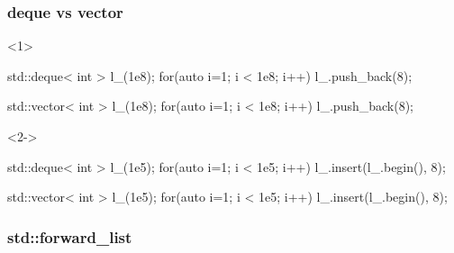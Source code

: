 \documentclass[aspectratio=43]{beamer}
\begin{document}
\begin{frame}[fragile]\frametitle{deque vs vector}
\begin{onlyenv}<1>
  \begin{Cpplisting}{}
std::deque< int > l_(1e8);
for(auto i=1; i < 1e8; i++){
  l_.push_back(8);
}
  \end{Cpplisting}
  \begin{Cpplisting}{}
std::vector< int > l_(1e8);
for(auto i=1; i < 1e8; i++){
  l_.push_back(8);
}
  \end{Cpplisting}
\end{onlyenv}

\begin{onlyenv}<2->
  \begin{Cpplisting}{}
std::deque< int > l_(1e5);
for(auto i=1; i < 1e5; i++){
  l_.insert(l_.begin(), 8);
}
  \end{Cpplisting}
  \begin{Cpplisting}{}
std::vector< int > l_(1e5);
for(auto i=1; i < 1e5; i++){
  l_.insert(l_.begin(), 8);
}
  \end{Cpplisting}
\end{onlyenv}
\end{frame}

\begin{frame}[fragile]\frametitle{std::forward\_list}
\end{frame}
\end{document}
